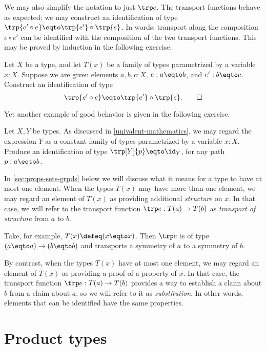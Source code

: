 We may also simplify the notation to just $\trp e$.
The transport functions behave as expected: we may construct an identification of type $\trp {e'\circ e} \eqto \trp {e'} \circ \trp {e}$.
In words: transport along the composition $e\circ e'$ can be identified with the composition of the two
transport functions.  This may be proved by induction in the following exercise.

\begin{xca}\label{xca:trp-compose}
  Let $X$ be a type, and let $T(x)$ be a family of types parametrized by a variable $x:X$.
  Suppose we are given elements $a,b,c:X$, $e:a \eqto b$, and $e':b \eqto c$.  Construct an identification of type
  \[
    \trp {e'\circ e} \eqto \trp {e'} \circ \trp {e}.\qedhere
  \]
\end{xca}

Yet another example of good behavior is given in the following exercise.

\begin{xca}\label{xca:trp-nondep}
  Let $X,Y$ be types.
  As discussed in \cref{univalent-mathematics}, we may regard the expression $Y$ as a constant family of types parametrized by a variable $x:X$.
  Produce an identification of type $\trp[Y]{p} \eqto \id_Y$, for any path $p:a \eqto b$.
\end{xca}

In \cref{sec:props-sets-grpds} below we will discuss what it means for a type to have at most one element.
When the types $T(x)$ may have more than one element,
we may regard an element of $T(x)$ as providing additional \emph{structure} on $x$.
In that case, we will refer to the transport function $\trp e : T(a) \to T(b)$ as
\emph{transport of structure} from $a$ to $b$.

Take, for example, $T(x)\defeq (x \eqto x)$.
Then $\trp e$ is of type $(a \eqto a) \to (b \eqto b)$ and transports a
symmetry of $a$ to a symmetry of $b$.

By contrast, when the types
$T(x)$ have at most one element, we may regard an element of $T(x)$
as providing a proof of a property of $x$. In that case, the transport
function $\trp e : T(a) \to T(b)$ provides a way to establish a claim about $b$
from a claim about $a$, so we will refer to it as \emph{substitution}.  In
other words, elements that can be identified have the same properties.

\section{Product types}
\label{sec:product-types}

